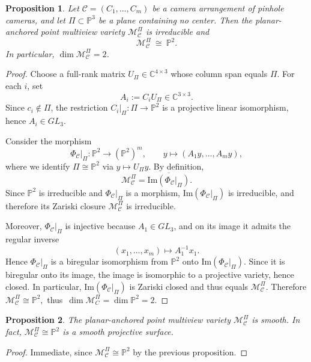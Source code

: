 \documentclass{article}
\newtheorem{proposition}{Proposition}
\newcommand{\CC}{\mathbb{C}}
\newcommand{\PP}{\mathbb{P}}
\begin{document}
\begin{proposition}\label{bireg.isomorphism} 
Let $\mathcal{C} = (C_1,\dots,C_m)$ be a camera arrangement of pinhole cameras, and let $\Pi\subset\PP^3$ be a plane
containing no center. Then the planar-anchored point multiview variety
$\mathcal{M}_\mathcal{C}^\Pi$ is irreducible and
\[
\mathcal{M}_\mathcal{C}^\Pi\ \cong\ \PP^2.
\]
In particular, $\dim\mathcal{M}_\mathcal{C}^\Pi=2$.
\end{proposition}

\begin{proof}
Choose a full-rank matrix $U_\Pi\in\CC^{4\times 3}$ whose column span equals $\Pi$. For each $i$, set
\[
A_i := C_i U_\Pi \in \CC^{3\times 3}.
\]
Since $c_i\notin\Pi$, the restriction $C_i|_\Pi:\Pi\to\PP^2$ is a
projective linear isomorphism, hence $A_i\in GL_3$.

Consider the morphism
\[
\Phi_{\mathcal C}|_\Pi:\PP^2 \longrightarrow (\PP^2)^m,
\qquad
y \longmapsto (A_1y,\dots,A_my),
\]
where we identify $\Pi \cong \PP^2$ via $y\mapsto U_\Pi y$.
By definition,
\[
\mathcal{M}_\mathcal{C}^\Pi = \overline{\mathrm{Im}(\Phi_{\mathcal C}|_\Pi)}.
\]
Since $\PP^2$ is irreducible and $\Phi_{\mathcal C}|_\Pi$ is a morphism,
$\mathrm{Im}(\Phi_{\mathcal C}|_\Pi)$ is irreducible, and therefore its Zariski closure $\mathcal{M}_\mathcal{C}^\Pi$ is irreducible.

Moreover, $\Phi_{\mathcal C}|_\Pi$ is injective because $A_1\in GL_3$, and on its image it admits the regular inverse
\[
(x_1,\dots,x_m)\longmapsto A_1^{-1}x_1.
\]
Hence $\Phi_{\mathcal C}|_\Pi$ is a biregular isomorphism from $\PP^2$ onto $\mathrm{Im}(\Phi_{\mathcal C}|_\Pi)$. Since it is biregular onto its image, the image is isomorphic to a projective variety, hence closed. In particular, $\mathrm{Im}(\Phi_{\mathcal C}|_\Pi)$ is Zariski closed and thus equals
$\mathcal{M}_\mathcal{C}^\Pi$. Therefore $\mathcal{M}_\mathcal{C}^\Pi \cong \PP^2,$ thus~$\dim \mathcal M_C^\Pi = \dim \PP^2 = 2.$
\end{proof}

\begin{proposition}
The planar-anchored point multiview variety $\mathcal{M}_\mathcal{C}^\Pi$ is smooth.
In fact, $\mathcal{M}_\mathcal{C}^\Pi\cong\PP^2$ is a smooth projective surface.
\end{proposition}

\begin{proof}
Immediate, since $\mathcal{M}_\mathcal{C}^\Pi\cong\PP^2$ by the previous proposition.
\end{proof}
\end{document}
